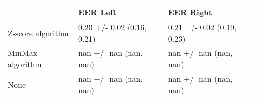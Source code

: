 \begin{tabular}{lll}
\toprule
{} &                    EER Left &                   EER Right \\
\midrule
Z-score algorithm &  0.20 +/- 0.02 (0.16, 0.21) &  0.21 +/- 0.02 (0.19, 0.23) \\
MinMax algorithm  &      nan +/- nan (nan, nan) &      nan +/- nan (nan, nan) \\
None              &      nan +/- nan (nan, nan) &      nan +/- nan (nan, nan) \\
\bottomrule
\end{tabular}
